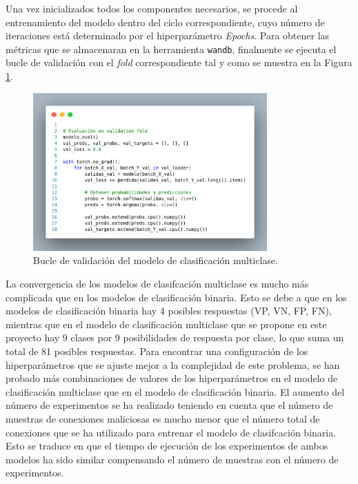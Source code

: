 Una vez inicializados todos los componentes necesarios, se procede al entrenamiento del modelo dentro del ciclo correspondiente, cuyo número de iteraciones está determinado por el hiperparámetro \textit{Epochs}. Para obtener las métricas que se almacenaran en la herramienta \texttt{wandb}, finalmente se ejecuta el bucle de validación con el \textit{fold} correspondiente tal y como se muestra en la Figura  \ref{fig:ValidacionCVMUL}.

\begin{figure}[H]
    \centering
    \includegraphics[width=0.8\textwidth]{./img/modelo/codigo/ValidacionCVMUL.png}
    \caption{Bucle de validación del modelo de clasificación multiclase.}
    \label{fig:ValidacionCVMUL}
\end{figure}



La convergencia de los modelos de clasifcación multiclase es mucho más complicada que en los modelos de clasificación binaria. Esto se debe a que en los modelos de clasificación binaria hay 4 posibles respuestas (VP, VN, FP, FN), mientras que en el  modelo de clasificación multiclase que se propone en este proyecto hay 9 clases por 9 posibilidades de respuesta por clase, lo que suma un total de 81 posibles respuestas. Para encontrar una configuración de los hiperparámetros que se ajuste mejor a la complejidad de este problema, se han probado más combinaciones de valores de los hiperparámetros en el modelo de clasificación multiclase que en el modelo de clasificación binaria. El aumento del número de experimentos se ha realizado teniendo en cuenta que el número de muestras de conexiones maliciosas es mucho menor que el número total de conexiones que se ha utilizado para entrenar el modelo de clasifcación binaria. Esto se traduce en que el tiempo de ejecución de los experimentos de ambos modelos ha sido similar compensando el número de muestras con el número de experimentos.





